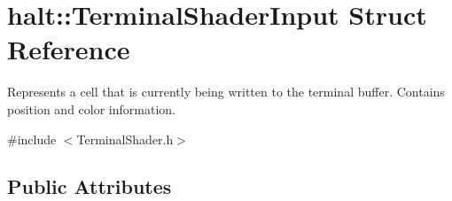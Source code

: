 \hypertarget{structhalt_1_1_terminal_shader_input}{\section{halt\-:\-:\-Terminal\-Shader\-Input \-Struct \-Reference}
\label{structhalt_1_1_terminal_shader_input}
}


\-Represents a cell that is currently being written to the terminal buffer. \-Contains position and color information.  




{\ttfamily \#include $<$\-Terminal\-Shader.\-h$>$}

\subsection*{\-Public \-Attributes}
